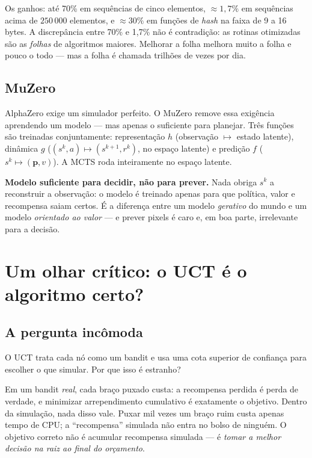 \documentclass[11pt]{article}
\begin{document}
Os ganhos: até 70\% em sequências de cinco elementos, $\approx 1{,}7\%$ em
sequências acima de $250\,000$ elementos, e $\approx 30\%$ em funções de
\emph{hash} na faixa de 9 a 16 bytes. A discrepância entre 70\% e 1,7\% não é
contradição: as rotinas otimizadas são as \emph{folhas} de algoritmos maiores.
Melhorar a folha melhora muito a folha e pouco o todo — mas a folha é chamada
trilhões de vezes por dia.

\subsection{MuZero}

AlphaZero exige um simulador perfeito. O MuZero remove essa exigência aprendendo
um modelo — mas apenas o suficiente para planejar. Três funções são treinadas
conjuntamente: representação $h$ (observação $\mapsto$ estado latente), dinâmica
$g$ ($(s^k,a) \mapsto (s^{k+1}, r^k)$, no espaço latente) e predição $f$
($s^k \mapsto (\bm{p}, v)$). A MCTS roda inteiramente no espaço latente.

\begin{ideiabox}
\textbf{Modelo suficiente para decidir, não para prever.} Nada obriga $s^k$ a
reconstruir a observação: o modelo é treinado apenas para que política, valor e
recompensa saiam certos. É a diferença entre um modelo \emph{gerativo} do mundo e
um modelo \emph{orientado ao valor} — e prever pixels é caro e, em boa parte,
irrelevante para a decisão.
\end{ideiabox}

\section{Um olhar crítico: o UCT é o algoritmo certo?}
\label{sec:critica}

\subsection{A pergunta incômoda}

O UCT trata cada nó como um bandit e usa uma cota superior de confiança para
escolher o que simular. Por que isso é estranho?

Em um bandit \emph{real}, cada braço puxado custa: a recompensa perdida é perda de
verdade, e minimizar arrependimento cumulativo é exatamente o objetivo. Dentro da
simulação, nada disso vale. Puxar mil vezes um braço ruim custa apenas tempo de
CPU; a ``recompensa'' simulada não entra no bolso de ninguém. O objetivo correto
não é acumular recompensa simulada — é \emph{tomar a melhor decisão na raiz ao
final do orçamento}.
\end{document}
